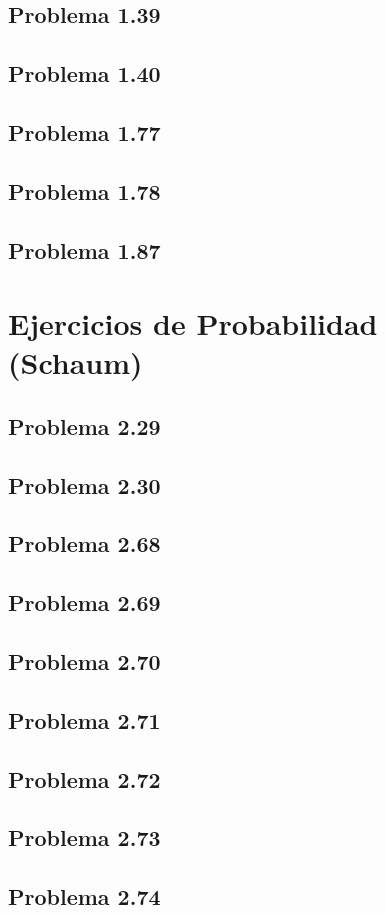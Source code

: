 \documentclass[12pt]{article}
\begin{document}
\subsection*{Problema 1.39}

\subsection*{Problema 1.40}

\subsection*{Problema 1.77}

\subsection*{Problema 1.78}

\subsection*{Problema 1.87}

\section*{Ejercicios de Probabilidad (Schaum)}

\subsection*{Problema 2.29}


\subsection*{Problema 2.30}


\subsection*{Problema 2.68}

\subsection*{Problema 2.69}


\subsection*{Problema 2.70}


\subsection*{Problema 2.71}

\subsection*{Problema 2.72}

\subsection*{Problema 2.73}

\subsection*{Problema 2.74}
\end{document}
